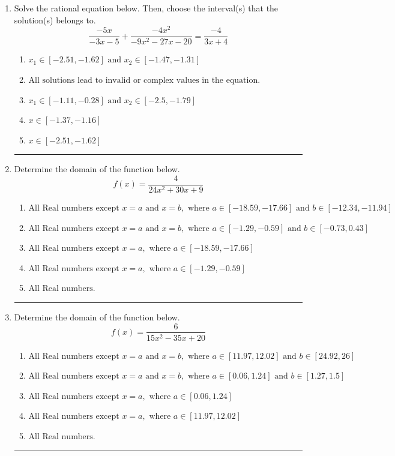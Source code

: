 \documentclass[14pt]{extbook}
\newcommand{\litem}[1]{\item#1\hspace*{-1cm}\rule{\textwidth}{0.4pt}}
\begin{document}
\begin{enumerate}
{\begin{enumerate}[label=\Alph*.]
\end{enumerate} }
\litem{
Solve the rational equation below. Then, choose the interval(s) that the solution(s) belongs to.\[ \frac{-5x}{-3x -5} + \frac{-4x^{2}}{-9x^{2} -27 x -20} = \frac{-4}{3x + 4} \]\begin{enumerate}[label=\Alph*.]
\item \( x_1 \in [-2.51, -1.62] \text{ and } x_2 \in [-1.47,-1.31] \)
\item \( \text{All solutions lead to invalid or complex values in the equation.} \)
\item \( x_1 \in [-1.11, -0.28] \text{ and } x_2 \in [-2.5,-1.79] \)
\item \( x \in [-1.37,-1.16] \)
\item \( x \in [-2.51,-1.62] \)

\end{enumerate} }
\litem{
Determine the domain of the function below.\[ f(x) = \frac{4}{24x^{2} +30 x + 9} \]\begin{enumerate}[label=\Alph*.]
\item \( \text{All Real numbers except } x = a \text{ and } x = b, \text{ where } a \in [-18.59, -17.66] \text{ and } b \in [-12.34, -11.94] \)
\item \( \text{All Real numbers except } x = a \text{ and } x = b, \text{ where } a \in [-1.29, -0.59] \text{ and } b \in [-0.73, 0.43] \)
\item \( \text{All Real numbers except } x = a, \text{ where } a \in [-18.59, -17.66] \)
\item \( \text{All Real numbers except } x = a, \text{ where } a \in [-1.29, -0.59] \)
\item \( \text{All Real numbers.} \)

\end{enumerate} }
\litem{
Determine the domain of the function below.\[ f(x) = \frac{6}{15x^{2} -35 x + 20} \]\begin{enumerate}[label=\Alph*.]
\item \( \text{All Real numbers except } x = a \text{ and } x = b, \text{ where } a \in [11.97, 12.02] \text{ and } b \in [24.92, 26] \)
\item \( \text{All Real numbers except } x = a \text{ and } x = b, \text{ where } a \in [0.06, 1.24] \text{ and } b \in [1.27, 1.5] \)
\item \( \text{All Real numbers except } x = a, \text{ where } a \in [0.06, 1.24] \)
\item \( \text{All Real numbers except } x = a, \text{ where } a \in [11.97, 12.02] \)
\item \( \text{All Real numbers.} \)


\end{enumerate}}
\end{enumerate}
\end{document}
